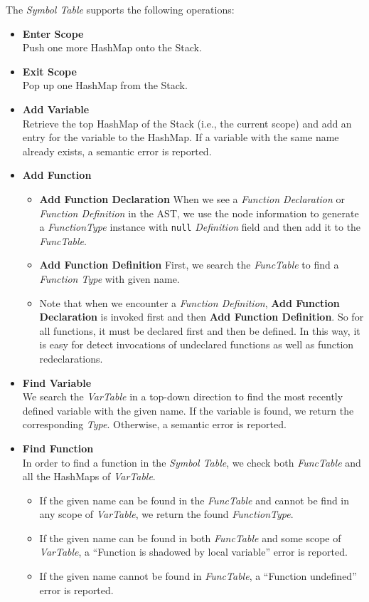 \documentclass[a4paper,11pt]{article}
\begin{document}
The \emph{Symbol Table} supports the following operations:
\begin{itemize}
	\item \textbf{Enter Scope}\\
	Push one more HashMap onto the Stack.

	\item \textbf{Exit Scope} \\
	Pop up one HashMap from the Stack.

	\item \textbf{Add Variable} \\
	Retrieve the top HashMap of the Stack (i.e., the current scope) and add an entry for the variable to the HashMap. If a variable with the same name already exists, a semantic error is reported.

	\item \textbf{Add Function}
	\begin{itemize}
		\item \textbf{Add Function Declaration}
			When we see a \emph{Function Declaration} or \emph{Function Definition} in the AST, we use the node information to generate a \emph{FunctionType} instance with \texttt{null} \emph{Definition} field and then add it to the \emph{FuncTable}.
		\item \textbf{Add Function Definition}
			First, we search the \emph{FuncTable} to find a \emph{Function Type} with given name.
		\item Note that when we encounter a \emph{Function Definition},
          \textbf{Add Function Declaration} is invoked first and then
          \textbf{Add Function Definition}. So for all functions, it must be
          declared first and then be defined. In this way, it is easy for detect
          invocations of undeclared functions as well as function
          redeclarations.
	\end{itemize}

	\item \textbf{Find Variable} \\
	We search the \emph{VarTable} in a top-down direction to find the most recently defined variable with the given name. If the variable is found, we return the corresponding \emph{Type}. Otherwise, a semantic error is reported.

	\item \textbf{Find Function} \\
	In order to find a function in the \emph{Symbol Table}, we check both \emph{FuncTable} and all the HashMaps of \emph{VarTable}.
	\begin{itemize}
		\item If the given name can be found in the \emph{FuncTable} and cannot be find in any scope of \emph{VarTable}, we return the found \emph{FunctionType}.
		\item If the given name can be found in both \emph{FuncTable} and some scope of \emph{VarTable}, a ``Function is shadowed by local variable'' error is reported.
		\item If the given name cannot be found in \emph{FuncTable}, a ``Function undefined'' error is reported.
	\end{itemize}

\end{itemize}
\end{document}
